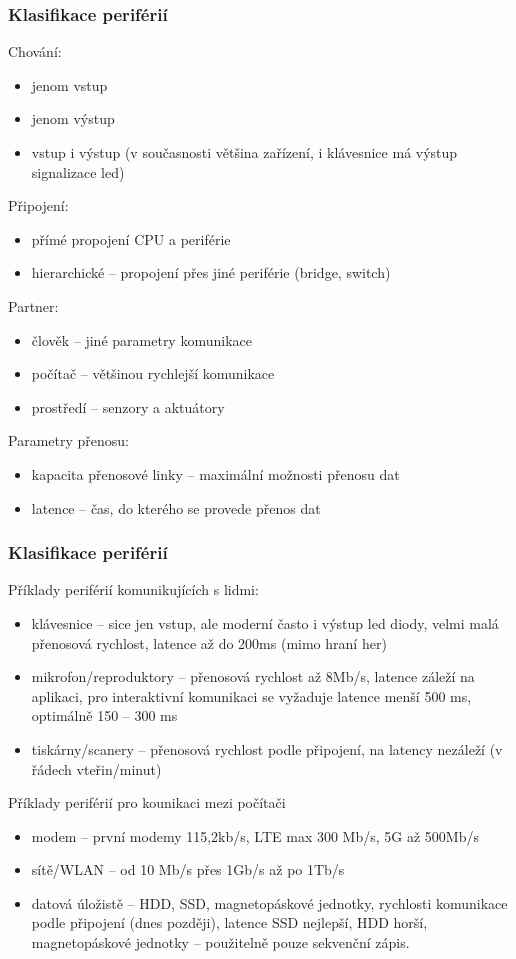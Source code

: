 \documentclass{beamer}
\begin{document}
\begin{frame}
\frametitle{Klasifikace periférií}
Chování:
\begin{itemize}
\item jenom vstup
\item jenom výstup
\item vstup i výstup (v současnosti většina zařízení, i klávesnice má výstup signalizace led)
\end{itemize}

Připojení:
\begin{itemize}
\item přímé propojení CPU a periférie
\item hierarchické -- propojení přes jiné periférie (bridge, switch)
\end{itemize}

Partner:
\begin{itemize}
\item člověk -- jiné parametry komunikace
\item počítač -- většinou rychlejší komunikace
\item prostředí -- senzory a aktuátory
\end{itemize}

Parametry přenosu:
\begin{itemize}
\item kapacita přenosové linky -- maximální možnosti přenosu dat
\item latence -- čas, do kterého se provede přenos dat
\end{itemize}
\end{frame}

\begin{frame}
\frametitle{Klasifikace periférií}

Příklady periférií komunikujících s lidmi:
\begin{itemize}
\item klávesnice -- sice jen vstup, ale moderní často i výstup led diody, velmi malá přenosová rychlost, latence až do 200ms (mimo hraní her) 
\item mikrofon/reproduktory -- přenosová rychlost až 8Mb/s, latence záleží na aplikaci, pro interaktivní komunikaci se vyžaduje latence menší 500 ms, optimálně 150 -- 300 ms 
\item tiskárny/scanery -- přenosová rychlost podle připojení, na latency nezáleží (v řádech vteřin/minut)
\end{itemize}

Příklady periférií pro kounikaci mezi počítači
\begin{itemize}
\item modem -- první modemy 115,2kb/s, LTE max 300 Mb/s, 5G až 500Mb/s
\item sítě/WLAN -- od 10 Mb/s přes 1Gb/s až po 1Tb/s
\item datová úložistě -- HDD, SSD, magnetopáskové jednotky, rychlosti komunikace podle připojení (dnes později), latence SSD nejlepší, HDD horší, magnetopáskové jednotky -- použitelně pouze sekvenční zápis.
\end{itemize}

\end{frame}
\end{document}
